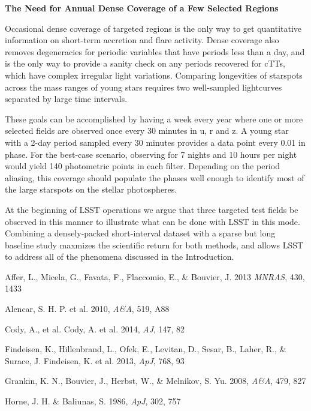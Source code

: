 \bf{The Need for Annual Dense Coverage of a Few Selected Regions}

Occasional dense coverage of targeted regions is the only way to
get quantitative information on short-term accretion and flare
activity.  Dense coverage also removes degeneracies
for periodic variables that have periods less than a day, and is
the only way to provide a sanity check on any periods recovered for
cTTs, which have complex irregular light variations.
Comparing longevities of starspots across the mass ranges of young
stars requires two well-sampled lightcurves separated by large
time intervals. 

These goals can be accomplished by having a week every year where
one or more selected fields are observed once every 30 minutes in u, r and z.
A young star with a 2-day period sampled every 30 minutes provides a 
data point every 0.01 in phase. For the best-case scenario, observing for 7 nights
and 10 hours per night would yield 140 photometric points in each filter.
Depending on the period aliasing, this coverage should populate the
phases well enough to identify most of the large starspots on the stellar photospheres.

At the beginning of LSST operations we argue that three targeted test fields
be observed in this manner to illustrate what can be done with LSST in this mode.
Combining a densely-packed short-interval
dataset with a sparse but long baseline study maxmizes the scientific return
for both methods, and allows LSST to address all of the phenomena
discussed in the Introduction.


{Affer, L., Micela, G., Favata, F., Flaccomio, E., \& Bouvier, J.} 2013
\textit{MNRAS}, 430, 1433

{Alencar, S. H. P. et al.} 2010,
\textit{A\&A}, 519, A88

Cody, A., et al.
{Cody, A. et al.} 2014,
\textit{AJ}, 147, 82 

Findeisen, K., Hillenbrand, L., Ofek, E., Levitan, D., Sesar, B., Laher, R., \& Surace, J.
{Findeisen, K. et al.} 2013,
\textit{ApJ}, 768, 93 

{Grankin, K. N., Bouvier, J., Herbst, W., \& Melnikov, S. Yu.} 2008,
\textit{A\&A}, 479, 827

{Horne, J. H. \& Baliunas, S.} 1986, \textit{ApJ}, 302, 757

\navigationbar
